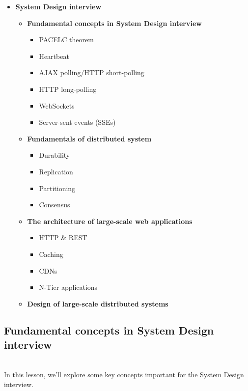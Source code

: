 \vspace{0.3cm}
\begin{itemize}
\item \textbf{System Design interview}
\begin{itemize}
\item \textbf{Fundamental concepts in System Design interview}
\begin{itemize}
\item PACELC theorem
\item Heartbeat
\item AJAX polling/HTTP short-polling
\item HTTP long-polling
\item WebSockets
\item Server-sent events (SSEs)
\end{itemize}
\end{itemize}
\begin{itemize}
\item \textbf{Fundamentals of distributed system}
\begin{itemize}
\item Durability
\item Replication
\item Partitioning
\item Consensus
\end{itemize}
\end{itemize}
\begin{itemize}
\item \textbf{The architecture of large-scale web applications}
\begin{itemize}
\item HTTP \& REST
\item Caching
\item CDNs
\item N-Tier applications
\end{itemize}
\end{itemize}
\begin{itemize}
\item \textbf{Design of large-scale distributed systems}
\end{itemize}
\end{itemize}

\subsection{Fundamental concepts in System Design interview}\label{6AuT2aNjnlxXD_1OxAsQN}
\\
In this lesson, we'll explore some key concepts important for the System Design interview.

